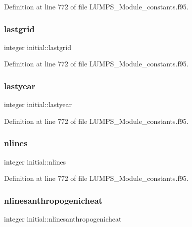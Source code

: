 Definition at line 772 of file L\+U\+M\+P\+S\+\_\+\+Module\+\_\+constants.\+f95.

\mbox{\label{namespaceinitial_a247bedafc3b9e5b5074be3df3c622439}} 
\subsubsection{\texorpdfstring{lastgrid}{lastgrid}}
{\footnotesize\ttfamily integer initial\+::lastgrid}



Definition at line 772 of file L\+U\+M\+P\+S\+\_\+\+Module\+\_\+constants.\+f95.

\mbox{\label{namespaceinitial_aacf5b4e12c32955da088ba130fe9588a}} 
\subsubsection{\texorpdfstring{lastyear}{lastyear}}
{\footnotesize\ttfamily integer initial\+::lastyear}



Definition at line 772 of file L\+U\+M\+P\+S\+\_\+\+Module\+\_\+constants.\+f95.

\mbox{\label{namespaceinitial_a866c6f9bce6417b259081b34ebbd9f4c}} 
\subsubsection{\texorpdfstring{nlines}{nlines}}
{\footnotesize\ttfamily integer initial\+::nlines}



Definition at line 772 of file L\+U\+M\+P\+S\+\_\+\+Module\+\_\+constants.\+f95.

\mbox{\label{namespaceinitial_a0f40beedf8434899dcbdd965487411c4}} 
\subsubsection{\texorpdfstring{nlinesanthropogenicheat}{nlinesanthropogenicheat}}
{\footnotesize\ttfamily integer initial\+::nlinesanthropogenicheat}



